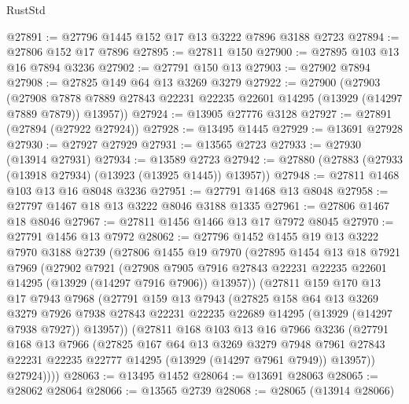 \begin{lexlean}{RustStd}
\begin{coremodule}
@27891 := @27796 @1445 @152 @17 @13 @3222 @7896 @3188 @2723
@27894 := @27806 @152 @17 @7896
@27895 := @27811 @150
@27900 := @27895 @103 @13 @16 @7894 @3236
@27902 := @27791 @150 @13
@27903 := @27902 @7894
@27908 := @27825 @149 @64 @13 @3269 @3279
@27922 := @27900
    (@27903
      (@27908 @7878 @7889 @27843 @22231 @22235 @22601 @14295 (@13929 (@14297 @7889 @7879)) @13957))
@27924 := @13905 @27776 @3128
@27927 := @27891 (@27894 (@27922 @27924))
@27928 := @13495 @1445
@27929 := @13691 @27928
@27930 := @27927 @27929
@27931 := @13565 @2723
@27933 := @27930 (@13914 @27931)
@27934 := @13589 @2723
@27942 := @27880 (@27883 (@27933 (@13918 @27934) (@13923 (@13925 @1445)) @13957))
@27948 := @27811 @1468 @103 @13 @16 @8048 @3236
@27951 := @27791 @1468 @13 @8048
@27958 := @27797 @1467 @18 @13 @3222 @8046 @3188 @1335
@27961 := @27806 @1467 @18 @8046
@27967 := @27811 @1456 @1466 @13 @17 @7972 @8045
@27970 := @27791 @1456 @13 @7972
@28062 := @27796
    @1452
    @1455
    @19
    @13
    @3222
    @7970
    @3188
    @2739
    (@27806
      @1455
      @19
      @7970
      (@27895
        @1454
        @13
        @18
        @7921
        @7969
        (@27902
          @7921
          (@27908
            @7905
            @7916
            @27843
            @22231
            @22235
            @22601
            @14295
            (@13929 (@14297 @7916 @7906))
            @13957))
        (@27811
          @159
          @170
          @13
          @17
          @7943
          @7968
          (@27791
            @159
            @13
            @7943
            (@27825
              @158
              @64
              @13
              @3269
              @3279
              @7926
              @7938
              @27843
              @22231
              @22235
              @22689
              @14295
              (@13929 (@14297 @7938 @7927))
              @13957))
          (@27811
            @168
            @103
            @13
            @16
            @7966
            @3236
            (@27791
              @168
              @13
              @7966
              (@27825
                @167
                @64
                @13
                @3269
                @3279
                @7948
                @7961
                @27843
                @22231
                @22235
                @22777
                @14295
                (@13929 (@14297 @7961 @7949))
                @13957))
            @27924))))
@28063 := @13495 @1452
@28064 := @13691 @28063
@28065 := @28062 @28064
@28066 := @13565 @2739
@28068 := @28065 (@13914 @28066)

\end{coremodule}
\end{lexlean}
